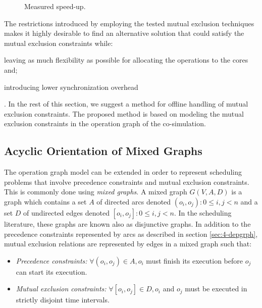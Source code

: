 \begin{figure}[phbt]
\centering

\caption{Measured speed-up.}
\label{fig:real-speedup}
\end{figure}


The restrictions introduced by employing the tested mutual exclusion techniques makes it highly desirable to find an alternative solution that could satisfy the mutual exclusion constraints while: \begin{inlinelist} \item leaving as much flexibility as possible for allocating the operations to the cores and; \item introducing lower synchronization overhead \end{inlinelist}. In the rest of this section, we suggest a method for offline handling of mutual exclusion constraints. The proposed method is based on modeling the mutual exclusion constraints in the operation graph of the co-simulation.

\subsection{Acyclic Orientation of Mixed Graphs}

The operation graph model can be extended in order to represent scheduling problems that involve precedence constraints and mutual exclusion constraints. This is commonly done using \textit{mixed graphs}. A mixed graph $G(V,A,D)$ is a graph which contains a set $A$ of directed arcs denoted $(o_i,o_j): 0 \leq i, j < n$ and a set $D$ of undirected edges denoted $[o_i,o_j]: 0 \leq i, j < n$. In the scheduling literature, these graphs are known also as disjunctive graphs. In addition to the precedence constraints represented by arcs as described in section \ref{sec:4-depgrph}, mutual exclusion relations are represented by edges in a mixed graph such that: 
\begin{itemize}
\item \textit{Precedence constraints:} $\forall (o_i,o_j) \in A, o_i$ must finish its execution before $o_j$ can start its execution.  
\item \textit{Mutual exclusion constraints:} $\forall [o_i,o_j] \in D, o_i$ and $o_j$ must be executed in strictly disjoint time intervals.
\end{itemize}

